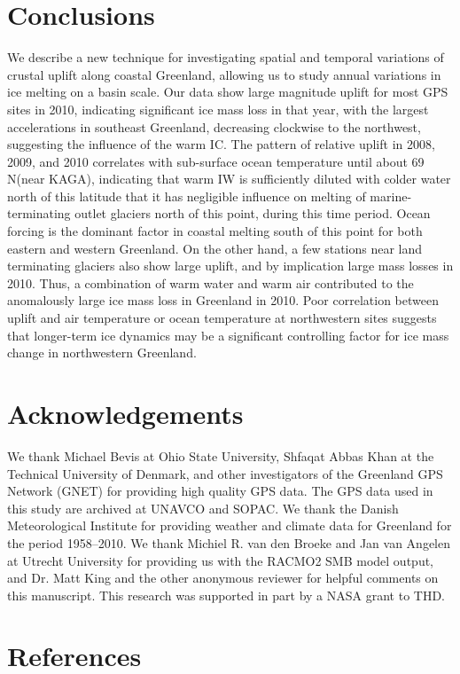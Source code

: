 \section{Conclusions}
We describe a new technique for investigating
spatial and temporal variations of crustal uplift along
coastal Greenland, allowing us to study annual
variations in ice melting on a basin scale. Our data
show large magnitude uplift for most GPS sites in
2010, indicating significant ice mass loss in that year,
with the largest accelerations in southeast Greenland,
decreasing clockwise to the northwest, suggesting the
influence of the warm IC. The pattern of relative uplift
in 2008, 2009, and 2010 correlates with sub-surface
ocean temperature until about 69 \textordmasculine N(near KAGA),
indicating that warm IW is sufficiently diluted with
colder water north of this latitude that it has negligible
influence on melting of marine-terminating
outlet glaciers north of this point, during this time
period. Ocean forcing is the dominant factor in
coastal melting south of this point for both eastern
and western Greenland. On the other hand, a few
stations near land terminating glaciers also show
large uplift, and by implication large mass losses in
2010. Thus, a combination of warm water and warm
air contributed to the anomalously large ice mass loss
in Greenland in 2010. Poor correlation between
uplift and air temperature or ocean temperature at
northwestern sites suggests that longer-term ice
dynamics may be a significant controlling factor for
ice mass change in northwestern Greenland.  

\section{Acknowledgements} 
We thank Michael Bevis at Ohio State University, Shfaqat
Abbas Khan at the Technical University of Denmark, and
other investigators of the Greenland GPS Network (GNET)
for providing high quality GPS data. The GPS data used in this
study are archived at UNAVCO and SOPAC. We thank the
Danish Meteorological Institute for providing weather and
climate data for Greenland for the period 1958–2010. We thank
Michiel R. van den Broeke and Jan van Angelen at Utrecht
University for providing us with the RACMO2 SMB model
output, and Dr. Matt King and the other anonymous reviewer
for helpful comments on this manuscript. This research was
supported in part by a NASA grant to THD.
\clearpage

\section{References}
  


